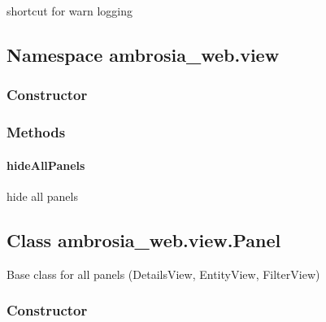 \documentclass[letterpaper,10pt,english]{sphinxmanual}
\begin{document}
shortcut for warn logging


\subsection{Namespace ambrosia\_web.view}
\label{ambrosia_web.view:namespace-ambrosia-web-view}\label{ambrosia_web.view::doc}

\subsubsection{Constructor}
\label{ambrosia_web.view:constructor}

\begin{fulllineitems}
\label{ambrosia_web.view:ambrosia_web.view}
\end{fulllineitems}



\subsubsection{Methods}
\label{ambrosia_web.view:methods}

\paragraph{hideAllPanels}
\label{ambrosia_web.view:hideallpanels}

\begin{fulllineitems}
\label{ambrosia_web.view:ambrosia_web.view.hideAllPanels}
\end{fulllineitems}


hide all panels


\subsection{Class ambrosia\_web.view.Panel}
\label{ambrosia_web.view.Panel:class-ambrosia-web-view-panel}\label{ambrosia_web.view.Panel::doc}
Base class for all panels (DetailsView, EntityView, FilterView)


\subsubsection{Constructor}
\label{ambrosia_web.view.Panel:constructor}
\end{document}
